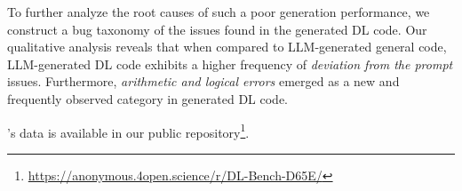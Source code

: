 To further analyze the root causes of such a poor generation performance, we construct a bug taxonomy of the issues found in the generated DL code. Our qualitative analysis reveals that when compared to LLM-generated general code, LLM-generated DL code exhibits a higher frequency of \textit{deviation from the prompt} issues. Furthermore, \textit{arithmetic and logical errors} emerged as a new and frequently observed category in generated DL code.

\tool's data is available in our public repository\footnote{\href{https://anonymous.4open.science/r/DL-Bench-D65E/}{https://anonymous.4open.science/r/DL-Bench-D65E/}}.








